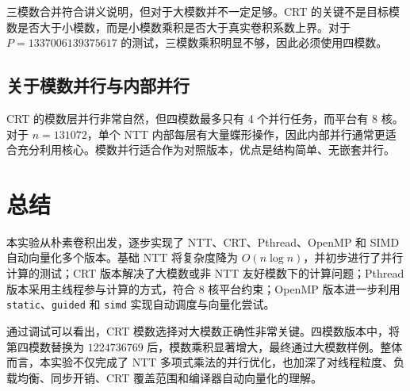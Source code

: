 \documentclass[a4paper]{article}
\begin{document}
三模数合并符合讲义说明，但对于大模数并不一定足够。CRT 的关键不是目标模数是否大于小模数，而是小模数乘积是否大于真实卷积系数上界。对于 $P=1337006139375617$ 的测试，三模数乘积明显不够，因此必须使用四模数。

\subsection{关于模数并行与内部并行}

CRT 的模数层并行非常自然，但四模数最多只有 4 个并行任务，而平台有 8 核。对于 $n=131072$，单个 NTT 内部每层有大量蝶形操作，因此内部并行通常更适合充分利用核心。模数并行适合作为对照版本，优点是结构简单、无嵌套并行。


\section{总结}

本实验从朴素卷积出发，逐步实现了 NTT、CRT、Pthread、OpenMP 和 SIMD 自动向量化多个版本。基础 NTT 将复杂度降为 $O(n\log n)$，并初步进行了并行计算的测试；CRT 版本解决了大模数或非 NTT 友好模数下的计算问题；Pthread 版本采用主线程参与计算的方式，符合 8 核平台约束；OpenMP 版本进一步利用 \texttt{static}、\texttt{guided} 和 \texttt{simd} 实现自动调度与向量化尝试。

通过调试可以看出，CRT 模数选择对大模数正确性非常关键。四模数版本中，将第四模数替换为 $1224736769$ 后，模数乘积显著增大，最终通过大模数样例。整体而言，本实验不仅完成了 NTT 多项式乘法的并行优化，也加深了对线程粒度、负载均衡、同步开销、CRT 覆盖范围和编译器自动向量化的理解。
\end{document}
